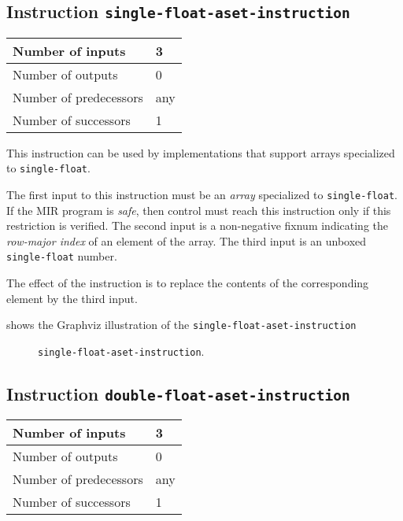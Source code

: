 \subsection{Instruction \texttt{single-float-aset-instruction}}
\label{mir-instruction-single-float-aset}

\begin{tabular}{|l|l|}
\hline
Number of inputs & 3\\
\hline
Number of outputs & 0\\
\hline
Number of predecessors & any\\
\hline
Number of successors & 1\\
\hline
\end{tabular}

This instruction can be used by implementations that support arrays
specialized to \texttt{single-float}.

The first input to this instruction must be an \emph{array}
specialized to \texttt{single-float}.  If the MIR program is
\emph{safe}, then control must reach this instruction only if this
restriction is verified.  The second input is a non-negative fixnum
indicating the \emph{row-major index} of an element of the array.  
The third input is an unboxed \texttt{single-float} number.

The effect of the instruction is to replace the contents of the
corresponding element by the third input.

 shows the Graphviz illustration of the
\texttt{single-float-aset-instruction}

\begin{figure}
\begin{center}
\end{center}
\caption{\label{fig-single-float-aset-instruction}
\texttt{single-float-aset-instruction}.}
\end{figure}

\subsection{Instruction \texttt{double-float-aset-instruction}}
\label{mir-instruction-double-float-aset}

\begin{tabular}{|l|l|}
\hline
Number of inputs & 3\\
\hline
Number of outputs & 0\\
\hline
Number of predecessors & any\\
\hline
Number of successors & 1\\
\hline
\end{tabular}

